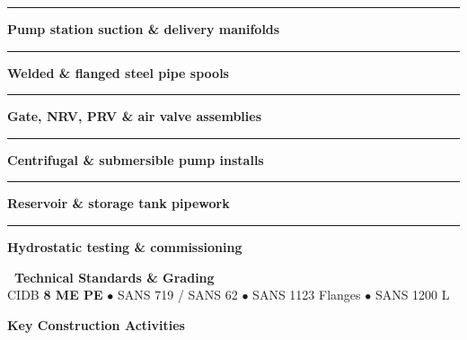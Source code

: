 \documentclass[a4paper,11pt]{article}
\begin{document}
\begin{minipage}[t]{0.34\textwidth}
    \vspace{0pt}
    \begin{tcolorbox}[
        enhanced, colback=mhoffwhite, colframe=mhnavy, boxrule=0.9pt, arc=4pt,
        title={\bfseries\color{white}\faCogs\ Scope of Work},
        colbacktitle=mhnavy, left=7pt, right=7pt, top=5pt, bottom=5pt, drop shadow=black!5
    ]
        \fontsize{7.8pt}{10.8pt}\selectfont
        \textcolor{mhnavy}{\rule{3.5pt}{3.5pt}}\hspace{4pt}\textbf{Pump station suction \& delivery manifolds}\\
        \textcolor{mhnavy}{\rule{3.5pt}{3.5pt}}\hspace{4pt}\textbf{Welded \& flanged steel pipe spools}\\
        \textcolor{mhnavy}{\rule{3.5pt}{3.5pt}}\hspace{4pt}\textbf{Gate, NRV, PRV \& air valve assemblies}\\
        \textcolor{mhnavy}{\rule{3.5pt}{3.5pt}}\hspace{4pt}\textbf{Centrifugal \& submersible pump installs}\\
        \textcolor{mhnavy}{\rule{3.5pt}{3.5pt}}\hspace{4pt}\textbf{Reservoir \& storage tank pipework}\\
        \textcolor{mhnavy}{\rule{3.5pt}{3.5pt}}\hspace{4pt}\textbf{Hydrostatic testing \& commissioning}
    \end{tcolorbox}

    \vspace{0.12cm}

    \begin{tcolorbox}[
        enhanced, colback=white, colframe=mhlightgray, boxrule=0.8pt, arc=4pt,
        left=6pt, right=6pt, top=5pt, bottom=5pt, drop shadow=black!3
    ]
        {\fontsize{7.5pt}{9.6pt}\selectfont\bfseries\color{mhnavy}\faCheckDouble\ Technical Standards \& Grading}\\[2pt]
        {\fontsize{7.3pt}{9.4pt}\selectfont\color{mhtextmuted}
        CIDB \textbf{8 ME PE} $\bullet$ SANS 719 / SANS 62 $\bullet$ SANS 1123 Flanges $\bullet$ SANS 1200 L}
    \end{tcolorbox}
\end{minipage}

\vfill

{\large\bfseries\color{mhnavy} Key Construction Activities}
\vspace{0.10cm}
\end{document}
